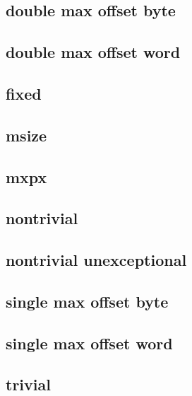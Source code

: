\subsection{double max offset byte}   
\subsection{double max offset word}   
\subsection{fixed}                    
\subsection{msize}                    
\subsection{mxpx}                     
\subsection{nontrivial}               
\subsection{nontrivial unexceptional} 
\subsection{single max offset byte}   
\subsection{single max offset word}   
\subsection{trivial}                  
